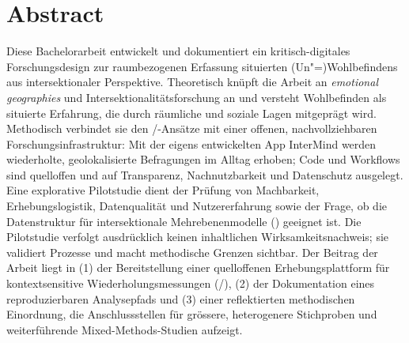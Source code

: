 \chapter*{Abstract}

Diese Bachelorarbeit entwickelt und dokumentiert ein kritisch-digitales Forschungsdesign zur raumbezogenen Erfassung situierten (Un\nobreakdash"=)Wohlbefindens aus intersektionaler Perspektive. Theoretisch knüpft die Arbeit an \emph{emotional geographies} und Intersektionalitätsforschung an und versteht Wohlbefinden als situierte Erfahrung, die durch räumliche und soziale Lagen mitgeprägt wird. Methodisch verbindet sie den /-Ansätze mit einer offenen, nachvollziehbaren Forschungsinfrastruktur: Mit der eigens entwickelten App InterMind werden wiederholte, geolokalisierte Befragungen im Alltag erhoben; Code und Workflows sind quelloffen und auf Transparenz, Nachnutzbarkeit und Datenschutz ausgelegt. Eine explorative Pilotstudie dient der Prüfung von Machbarkeit, Erhebungslogistik, Datenqualität und Nutzererfahrung sowie der Frage, ob die Datenstruktur für intersektionale Mehrebenenmodelle () geeignet ist. Die Pilotstudie verfolgt ausdrücklich keinen inhaltlichen Wirksamkeitsnachweis; sie validiert Prozesse und macht methodische Grenzen sichtbar. Der Beitrag der Arbeit liegt in (1) der Bereitstellung einer quelloffenen  Erhebungsplattform für kontextsensitive Wiederholungsmessungen (/), (2) der Dokumentation eines reproduzierbaren Analysepfads und (3) einer reflektierten methodischen Einordnung, die Anschlussstellen für grössere, heterogenere Stichproben und weiterführende Mixed-Methods-Studien aufzeigt.